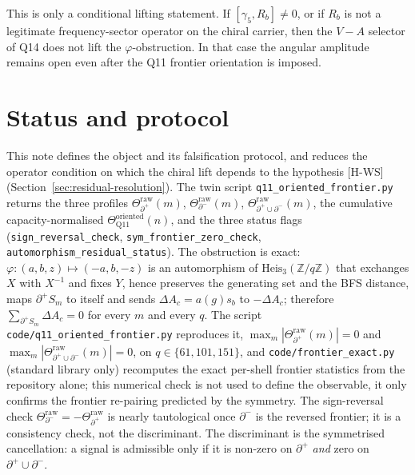 \documentclass[11pt]{article}
\begin{document}
    This is only a conditional lifting statement.
    If $[\gamma_5,R_b]\neq0$, or if $R_b$ is not a legitimate frequency-sector
    operator on the chiral carrier, then the $V-A$ selector of Q14 does not lift the
    $\varphi$-obstruction.
    In that case the angular amplitude remains open even after the Q11 frontier
    orientation is imposed.

  \section{Status and protocol}

    This note defines the object and its falsification protocol, and reduces the operator condition
    on which the chiral lift depends to the hypothesis [H-WS] (Section~\ref{sec:residual-resolution}).
    The twin script \texttt{q11\_oriented\_frontier.py} returns the three profiles
    $\Theta^{\mathrm{raw}}_{\partial^+}(m)$, $\Theta^{\mathrm{raw}}_{\partial^-}(m)$,
    $\Theta^{\mathrm{raw}}_{\partial^+\cup\partial^-}(m)$, the cumulative capacity-normalised
    $\Theta_{\mathrm{Q11}}^{\mathrm{oriented}}(n)$, and the three status flags
    (\texttt{sign\_reversal\_check}, \texttt{sym\_frontier\_zero\_check},
    \texttt{automorphism\_residual\_status}).
    The obstruction is exact: $\varphi:(a,b,z)\mapsto(-a,b,-z)$ is an automorphism of
    $\mathrm{Heis}_3(\mathbb{Z}/q\mathbb{Z})$ that exchanges $X$ with $X^{-1}$ and fixes $Y$, hence preserves the
    generating set and the BFS distance, maps $\partial^+S_m$ to itself and sends $\Delta A_c=a(g)s_b$ to
    $-\Delta A_c$; therefore $\sum_{\partial^+S_m}\Delta A_c=0$ for every $m$ and every $q$.
    The script \texttt{code/q11\_oriented\_frontier.py} reproduces it,
    $\max_m|\Theta^{\mathrm{raw}}_{\partial^+}(m)|=0$ and
    $\max_m|\Theta^{\mathrm{raw}}_{\partial^+\cup\partial^-}(m)|=0$, on $q\in\{61,101,151\}$, and
    \texttt{code/frontier\_exact.py} (standard library only) recomputes the exact per-shell frontier statistics from
    the repository alone; this numerical check is not used to define the observable, it only confirms the
    frontier re-pairing predicted by the symmetry.
    The sign-reversal check $\Theta^{\mathrm{raw}}_{\partial^-}=-\Theta^{\mathrm{raw}}_{\partial^+}$ is nearly
    tautological once $\partial^-$ is the reversed frontier; it is a consistency check, not the discriminant.
    The discriminant is the symmetrised cancellation: a signal is admissible only if it is non-zero on
    $\partial^+$ \emph{and} zero on $\partial^+\cup\partial^-$.
\end{document}
